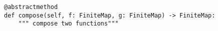 \begin{verbatim}
@abstractmethod
def compose(self, f: FiniteMap, g: FiniteMap) -> FiniteMap:
    """ compose two functions"""
\end{verbatim}